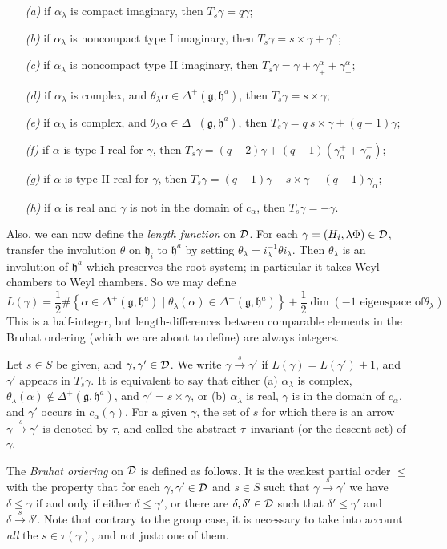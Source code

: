 \documentclass[11 pt]{article}
\def\ra{\rightarrow}
\def\rao#1{\overset{#1}\ra}
\def\1{^{-1}}
\def\a{\alpha}
\def\D{{\cal D}}
\def\d{\delta}
\def\F{\Phi}
\def\g{\gamma}
\def\gf{{\mathfrak g}}
\def\hf{{\mathfrak h}}
\def\l{\lambda}
\def\t{\theta}
\begin{document}
\begin{itemize}
\item[\it(a)]if $\a_\l$ is compact imaginary, then $T_s\g=q\g$;
\item[\it(b)]if $\a_\l$ is noncompact type I imaginary, then
$T_s\g=s\times\g+\g^\a$;
\item[\it(c)]if $\a_\l$ is noncompact type II imaginary, then
$T_s\g=\g+\g^\a_++\g^\a_-$;
\item[\it(d)]if $\a_\l$ is complex, and $\t_\l\a\in\Delta^+(\gf,\hf^a)$,
then $T_s\g=s\times\g$;
\item[\it(e)]if $\a_\l$ is complex, and $\t_\l\a\in\Delta^-(\gf,\hf^a)$,
then $T_s\g=q\>s\times\g+(q-1)\g$;
\item[\it(f)]if $\a$ is type I real for $\g$, then
$T_s\g=(q-2)\g+(q-1)(\g_\a^++\g_\a^-)$;
\item[\it(g)]if $\a$ is type II real for $\g$, then
$T_s\g=(q-1)\g-s\times\g+(q-1)\g_\a$;
\item[\it(h)]if $\a$ is real and $\g$ is not in the domain of $c_\a$,
then $T_s\g=-\g$.
\end{itemize}

\medskip

Also, we can now define the \textit{length function} on $\D$. For each
$\g=(H_i,\l\F)\in\D$, transfer the involution $\t$ on $\hf_i$ to $\hf^a$
by setting $\t_\l=i_\l\1\t i_\l$. Then $\t_\l$ is an involution of $\hf^a$
which preserves the root system; in particular it takes Weyl chambers to
Weyl chambers. So we may define
$$
L(\g)=\frac{1}{2}\#\left\{\a\in\Delta^+(\gf,\hf^a)\mid\t_\l(\a)\in
\Delta^-(\gf,\hf^a)\right\}+\frac{1}{2}\dim(\textrm{$-1$ eigenspace of
$\t_\l$})
$$
This is a half-integer, but length-differences between comparable elements
in the Bruhat ordering (which we are about to define) are always integers.

\medskip

Let $s\in S$ be given, and $\g,\g'\in\D$. We write $\g\rao s\g'$ if
$L(\g)=L(\g')+1$, and $\g'$ appears in $T_s\g$. It is equivalent to say
that either (a) $\a_\l$ is complex, $\t_\l(\a)\not\in\Delta^+(\gf,\hf^a)$,
and $\g'=s\times\g$, or (b) $\a_\l$ is real, $\g$ is in the domain of $c_\a$,
and $\g'$ occurs in $c_\a(\g)$. For a given $\g$, the set of $s$ for which
there is an arrow $\g\rao s\g'$ is denoted by $\tau$, and called the
abstract $\tau$--invariant (or the descent set) of $\g$.

The {\em Bruhat ordering} on $\D$ is defined as follows. It is the weakest
partial order $\leq$ with the property that for each $\g,\g'\in\D$ and $s\in S$
such that $\g\rao s\g'$ we have $\d\leq\g$ if and only if either $\d\leq\g'$,
or there are $\d,\d'\in\D$ such that $\d'\leq\g'$ and $\d\rao s\d'$. Note that
contrary to the group case, it is necessary to take into account {\em all} the
$s\in\tau(\g)$, and not justo one of them.
\end{document}
